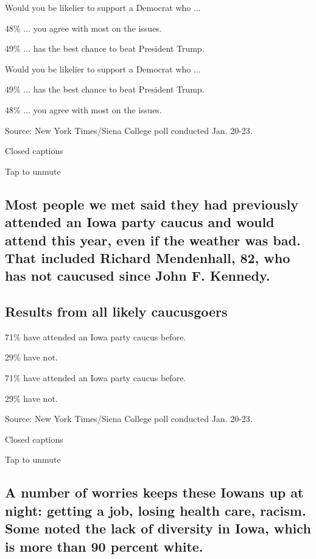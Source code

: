 Would you be likelier to support a Democrat who ...

48\% ... you agree with most on the issues.

49\% ... has the best chance to beat President Trump.

Would you be likelier to support a Democrat who ...

49\% ... has the best chance to beat President Trump.

48\% ... you agree with most on the issues.

Source: New York Times/Siena College poll conducted Jan. 20-23.

Closed captions

Tap to unmute

\hypertarget{most-people-we-met-said-they-had-previously-attended-an-iowa-party-caucus-and-would-attend-this-year-even-if-the-weather-was-bad-that-included-richard-mendenhall-82-who-has-not-caucused-since-john-f-kennedy}{%
\subsection{Most people we met said they had previously attended an Iowa
party caucus and would attend this year, even if the weather was bad.
That included Richard Mendenhall, 82, who has not caucused since John F.
Kennedy.}\label{most-people-we-met-said-they-had-previously-attended-an-iowa-party-caucus-and-would-attend-this-year-even-if-the-weather-was-bad-that-included-richard-mendenhall-82-who-has-not-caucused-since-john-f-kennedy}}

\hypertarget{results-from-all-likely-caucusgoers-2}{%
\subsection{Results from all likely
caucusgoers}\label{results-from-all-likely-caucusgoers-2}}

71\% have attended an Iowa party caucus before.

29\% have not.

71\% have attended an Iowa party caucus before.

29\% have not.

Source: New York Times/Siena College poll conducted Jan. 20-23.

Closed captions

Tap to unmute

\hypertarget{a-number-of-worries-keeps-these-iowans-up-at-night-getting-a-job-losing-health-care-racism-some-noted-the-lack-of-diversity-in-iowa-which-is-more-than-90-percent-white}{%
\subsection{A number of worries keeps these Iowans up at night: getting
a job, losing health care, racism. Some noted the lack of diversity in
Iowa, which is more than 90 percent
white.}\label{a-number-of-worries-keeps-these-iowans-up-at-night-getting-a-job-losing-health-care-racism-some-noted-the-lack-of-diversity-in-iowa-which-is-more-than-90-percent-white}}

